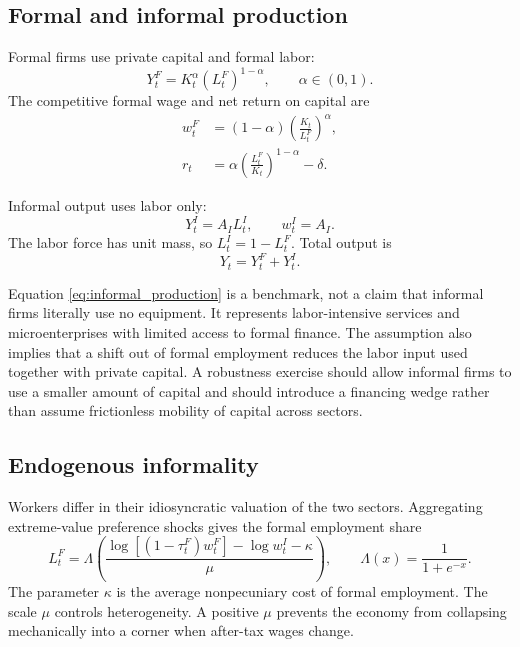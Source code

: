 \documentclass[12pt]{article}
\begin{document}
\subsection{Formal and informal production}

Formal firms use private capital and formal labor:
\begin{equation}
  Y_t^F=K_t^\alpha(L_t^F)^{1-\alpha},
  \qquad \alpha\in(0,1).
  \label{eq:formal_production}
\end{equation}
The competitive formal wage and net return on capital are
\begin{align}
  w_t^F
  &=
  (1-\alpha)
  \left(\frac{K_t}{L_t^F}\right)^\alpha,
  \label{eq:formal_wage}
  \\
  r_t
  &=
  \alpha
  \left(\frac{L_t^F}{K_t}\right)^{1-\alpha}
  -\delta.
  \label{eq:return}
\end{align}

Informal output uses labor only:
\begin{equation}
  Y_t^I=A_I L_t^I,
  \qquad
  w_t^I=A_I.
  \label{eq:informal_production}
\end{equation}
The labor force has unit mass, so $L_t^I=1-L_t^F$. Total output is
\begin{equation}
  Y_t=Y_t^F+Y_t^I.
  \label{eq:total_output}
\end{equation}

Equation \eqref{eq:informal_production} is a benchmark, not a claim that
informal firms literally use no equipment. It represents labor-intensive
services and microenterprises with limited access to formal finance. The
assumption also implies that a shift out of formal employment reduces the
labor input used together with private capital. A robustness exercise should
allow informal firms to use a smaller amount of capital and should introduce a
financing wedge rather than assume frictionless mobility of capital across
sectors.

\subsection{Endogenous informality}

Workers differ in their idiosyncratic valuation of the two sectors. Aggregating
extreme-value preference shocks gives the formal employment share
\begin{equation}
  L_t^F
  =
  \Lambda\left(
    \frac{
      \log[(1-\tau_t^F)w_t^F]
      -\log w_t^I-\kappa
    }{\mu}
  \right),
  \qquad
  \Lambda(x)=\frac{1}{1+e^{-x}}.
  \label{eq:formal_choice}
\end{equation}
The parameter $\kappa$ is the average nonpecuniary cost of formal employment.
The scale $\mu$ controls heterogeneity. A positive $\mu$ prevents the economy
from collapsing mechanically into a corner when after-tax wages change.
\end{document}

